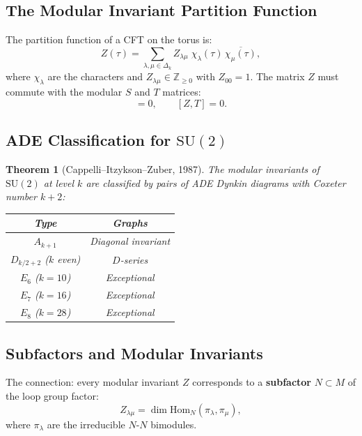 \documentclass[11pt,a4paper]{article}
\newtheorem{theorem}{Theorem}[section]
\begin{document}
\subsection{The Modular Invariant Partition Function}

The partition function of a CFT on the torus is:
\begin{equation}
  Z(\tau) = \sum_{\lambda, \mu \in \Delta_k} Z_{\lambda\mu}\;
  \chi_\lambda(\tau)\, \overline{\chi_\mu(\tau)},
\end{equation}
where $\chi_\lambda$ are the characters and $Z_{\lambda\mu} \in \mathbb{Z}_{\geq 0}$
with $Z_{00} = 1$. The matrix $Z$ must commute with the modular $S$ and
$T$ matrices:
\begin{equation}
  [Z, S] = 0, \qquad [Z, T] = 0.
\end{equation}

\subsection{ADE Classification for $\mathrm{SU}(2)$}

\begin{theorem}[Cappelli--Itzykson--Zuber, 1987]
The modular invariants of $\mathrm{SU}(2)$ at level $k$ are classified by
pairs of ADE Dynkin diagrams with Coxeter number $k+2$:
\begin{center}
\begin{tabular}{c|c}
\textbf{Type} & \textbf{Graphs} \\ \hline
$A_{k+1}$ & Diagonal invariant \\
$D_{k/2+2}$ ($k$ even) & $D$-series \\
$E_6$ ($k=10$) & Exceptional \\
$E_7$ ($k=16$) & Exceptional \\
$E_8$ ($k=28$) & Exceptional
\end{tabular}
\end{center}
\end{theorem}

\subsection{Subfactors and Modular Invariants}

The connection: every modular invariant $Z$ corresponds to a
\textbf{subfactor} $N \subset M$ of the loop group factor:
\begin{equation}
  Z_{\lambda\mu} = \dim \mathrm{Hom}_N(\pi_\lambda, \pi_\mu),
\end{equation}
where $\pi_\lambda$ are the irreducible $N$-$N$ bimodules.
\end{document}
